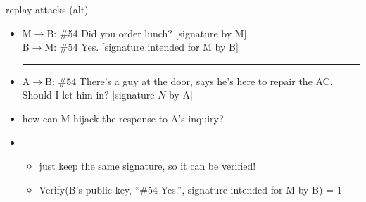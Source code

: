 \begin{frame}{replay attacks (alt)}
    \begin{itemize}
    \item M$\rightarrow$B: \#54 Did you order lunch? [signature by M] \\
          B$\rightarrow$M: \#54 Yes. [signature intended for M by B]  \\
    \hrule
    \item<2-> A$\rightarrow$B: \#54 There's a guy at the door, says he's here to repair the AC. Should I let him in? [signature $N$ by A]
    \vspace{.5cm}
    \item<2-> how can M hijack the response to A's inquiry?
    \item<3-> 
        \begin{itemize}
        \item just keep the same signature, so it can be verified!
        \item Verify(B's public key, ``\#54 Yes.'', signature intended for M by B) = 1
        \end{itemize}
    \end{itemize}
\end{frame}

